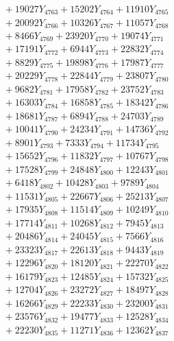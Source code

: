 \documentclass[a4paper,10pt]{article}
\begin{document}
{\begin{align}
&\;  + 19027 Y_{4763} + 15202 Y_{4764} + 11910 Y_{4765} \\[0.3ex]
&\;  + 20092 Y_{4766} + 10326 Y_{4767} + 11057 Y_{4768} \\[0.5ex]\allowbreak
&\;  + 8466 Y_{4769} + 23920 Y_{4770} + 19074 Y_{4771} \\[0.3ex]
&\;  + 17191 Y_{4772} + 6944 Y_{4773} + 22832 Y_{4774} \\[0.3ex]
&\;  + 8829 Y_{4775} + 19898 Y_{4776} + 17987 Y_{4777} \\[0.3ex]
&\;  + 20229 Y_{4778} + 22844 Y_{4779} + 23807 Y_{4780} \\[0.3ex]
&\;  + 9682 Y_{4781} + 17958 Y_{4782} + 23752 Y_{4783} \\[0.3ex]
&\;  + 16303 Y_{4784} + 16858 Y_{4785} + 18342 Y_{4786} \\[0.3ex]
&\;  + 18681 Y_{4787} + 6894 Y_{4788} + 24703 Y_{4789} \\[0.3ex]
&\;  + 10041 Y_{4790} + 24234 Y_{4791} + 14736 Y_{4792} \\[0.3ex]
&\;  + 8901 Y_{4793} + 7333 Y_{4794} + 11734 Y_{4795} \\[0.3ex]
&\;  + 15652 Y_{4796} + 11832 Y_{4797} + 10767 Y_{4798} \\[0.5ex]\allowbreak
&\;  + 17528 Y_{4799} + 24848 Y_{4800} + 12243 Y_{4801} \\[0.3ex]
&\;  + 6418 Y_{4802} + 10428 Y_{4803} + 9789 Y_{4804} \\[0.3ex]
&\;  + 11531 Y_{4805} + 22667 Y_{4806} + 25213 Y_{4807} \\[0.3ex]
&\;  + 17935 Y_{4808} + 11514 Y_{4809} + 10249 Y_{4810} \\[0.3ex]
&\;  + 17714 Y_{4811} + 10268 Y_{4812} + 7945 Y_{4813} \\[0.3ex]
&\;  + 20486 Y_{4814} + 24045 Y_{4815} + 7566 Y_{4816} \\[0.3ex]
&\;  + 23323 Y_{4817} + 22613 Y_{4818} + 9443 Y_{4819} \\[0.3ex]
&\;  + 12296 Y_{4820} + 18120 Y_{4821} + 22270 Y_{4822} \\[0.3ex]
&\;  + 16179 Y_{4823} + 12485 Y_{4824} + 15732 Y_{4825} \\[0.3ex]
&\;  + 12704 Y_{4826} + 23272 Y_{4827} + 18497 Y_{4828} \\[0.5ex]\allowbreak
&\;  + 16266 Y_{4829} + 22233 Y_{4830} + 23200 Y_{4831} \\[0.3ex]
&\;  + 23576 Y_{4832} + 19477 Y_{4833} + 12528 Y_{4834} \\[0.3ex]
&\;  + 22230 Y_{4835} + 11271 Y_{4836} + 12362 Y_{4837} \\[0.3ex]

\end{align}}
\end{document}
